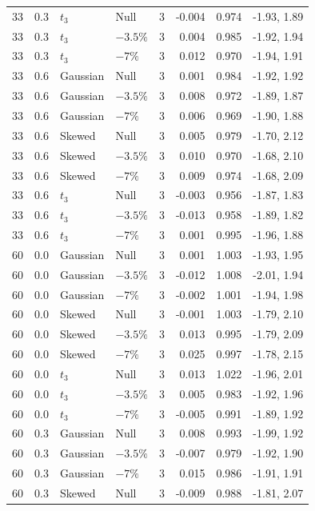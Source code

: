 \begin{longtable}{rrllrrrr}
33 & 0.3 & $t_3$ & Null & 3 & -0.004 & 0.974 & -1.93, 1.89 \\
33 & 0.3 & $t_3$ & $-3.5\%$ & 3 & 0.004 & 0.985 & -1.92, 1.94 \\
33 & 0.3 & $t_3$ & $-7\%$ & 3 & 0.012 & 0.970 & -1.94, 1.91 \\
33 & 0.6 & Gaussian & Null & 3 & 0.001 & 0.984 & -1.92, 1.92 \\
33 & 0.6 & Gaussian & $-3.5\%$ & 3 & 0.008 & 0.972 & -1.89, 1.87 \\
33 & 0.6 & Gaussian & $-7\%$ & 3 & 0.006 & 0.969 & -1.90, 1.88 \\
33 & 0.6 & Skewed & Null & 3 & 0.005 & 0.979 & -1.70, 2.12 \\
33 & 0.6 & Skewed & $-3.5\%$ & 3 & 0.010 & 0.970 & -1.68, 2.10 \\
33 & 0.6 & Skewed & $-7\%$ & 3 & 0.009 & 0.974 & -1.68, 2.09 \\
33 & 0.6 & $t_3$ & Null & 3 & -0.003 & 0.956 & -1.87, 1.83 \\
33 & 0.6 & $t_3$ & $-3.5\%$ & 3 & -0.013 & 0.958 & -1.89, 1.82 \\
33 & 0.6 & $t_3$ & $-7\%$ & 3 & 0.001 & 0.995 & -1.96, 1.88 \\
60 & 0.0 & Gaussian & Null & 3 & 0.001 & 1.003 & -1.93, 1.95 \\
60 & 0.0 & Gaussian & $-3.5\%$ & 3 & -0.012 & 1.008 & -2.01, 1.94 \\
60 & 0.0 & Gaussian & $-7\%$ & 3 & -0.002 & 1.001 & -1.94, 1.98 \\
60 & 0.0 & Skewed & Null & 3 & -0.001 & 1.003 & -1.79, 2.10 \\
60 & 0.0 & Skewed & $-3.5\%$ & 3 & 0.013 & 0.995 & -1.79, 2.09 \\
60 & 0.0 & Skewed & $-7\%$ & 3 & 0.025 & 0.997 & -1.78, 2.15 \\
60 & 0.0 & $t_3$ & Null & 3 & 0.013 & 1.022 & -1.96, 2.01 \\
60 & 0.0 & $t_3$ & $-3.5\%$ & 3 & 0.005 & 0.983 & -1.92, 1.96 \\
60 & 0.0 & $t_3$ & $-7\%$ & 3 & -0.005 & 0.991 & -1.89, 1.92 \\
60 & 0.3 & Gaussian & Null & 3 & 0.008 & 0.993 & -1.99, 1.92 \\
60 & 0.3 & Gaussian & $-3.5\%$ & 3 & -0.007 & 0.979 & -1.92, 1.90 \\
60 & 0.3 & Gaussian & $-7\%$ & 3 & 0.015 & 0.986 & -1.91, 1.91 \\
60 & 0.3 & Skewed & Null & 3 & -0.009 & 0.988 & -1.81, 2.07 \\

\end{longtable}

